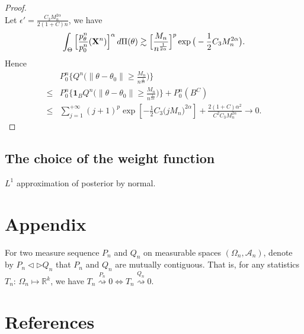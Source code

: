 \documentclass[3p]{elsarticle}
\theoremstyle{plain}
\theoremstyle{definition}
\theoremstyle{remark}
\begin{document}
\begin{proof}
$$     $$
     Let $\epsilon'=\frac{C_3 M_n^{2\alpha}}{2(1+C)n}$, we have
     $$
     \int_{\Theta}\Big[\frac{p_{\theta}^n}{p_0^n}(\mathbf{X}^n)\Big]^{\alpha} \, d\Pi(\theta)
     \gtrsim \Big[\frac{M_n}{n^{\frac{1}{2\alpha}}}\Big]^p \exp \big(-\frac{1}{2} C_3 M_n^{2\alpha}\big).
     $$
     Hence 
     $$
     \begin{aligned}
         &P_0^n \Big\{ Q^n\big(\|\theta-\theta_0\|\geq \frac{M_n}{n^{\frac{1}{2\alpha}}}\big)\Big\}\\
         \leq&P_0^n \Big\{ \mathbf{1}_{B} Q^n\big( \|\theta-\theta_0\|\geq \frac{M_n}{n^{\frac{1}{2\alpha}}}\big)\Big\}+P_0^n (B^C)\\
         \leq& 
        \sum_{j=1}^{+\infty}
        (j+1)^p
         \exp[- \frac{1}{2}C_3 \Big({jM_n}\Big)^{2\alpha}]
         +
         \frac{2(1+C)\alpha^2}{C^2 C_3 M_n^{2\alpha}}\to 0.
     \end{aligned}
     $$
\end{proof}




\subsection{The choice of the weight function}
$L^1$ approximation of posterior by normal.


%




\section{Appendix}
For two measure sequence $P_n$ and $Q_n$ on measurable spaces $(\Omega_n,\mathcal{A}_n)$, denote by $P_n\triangleleft \triangleright Q_n$ that $P_n$ and $Q_n$ are mutually contiguous. That is, for any statistics $T_n$: $\Omega_n\mapsto \mathbb{R}^k$, we have $T_n\overset{P_n}{\rightsquigarrow}0\Leftrightarrow T_n\overset{Q_n}{\rightsquigarrow}0$.



\section*{References}


\end{document}
